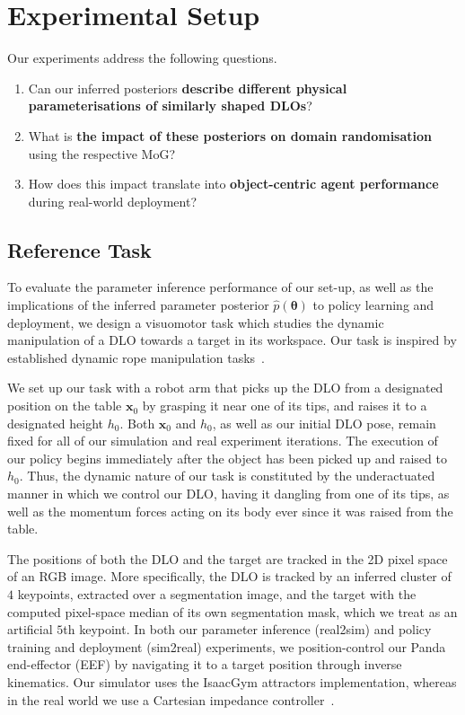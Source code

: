 \section{Experimental Setup}
\label{sec:experiments}

Our experiments address the following questions.
\begin{enumerate}
    \item Can our inferred posteriors \textbf{describe different physical parameterisations of similarly shaped DLOs}?
    \item What is \textbf{the impact of these posteriors on domain randomisation} using the respective MoG?
    \item How does this impact translate into \textbf{object-centric agent performance} during real-world deployment?
\end{enumerate}

\subsection{Reference Task}
\label{subsec:reference-task}

To evaluate the parameter inference performance of our set-up, as well as the implications of the inferred parameter posterior $\hat{p}(\boldsymbol{\theta})$ to policy learning and deployment, we design a visuomotor task which studies the dynamic manipulation of a DLO towards a target in its workspace. Our task is inspired by established dynamic rope manipulation tasks~\cite{lim2022real2sim2real, chi2024iterative}. 

We set up our task with a robot arm that picks up the DLO from a designated position on the table $\mathbf{x}_0$ by grasping it near one of its tips, and raises it to a designated height $h_0$. Both $\mathbf{x}_0$ and $h_0$, as well as our initial DLO pose, remain fixed for all of our simulation and real experiment iterations. The execution of our policy begins immediately after the object has been picked up and raised to $h_0$. Thus, the dynamic nature of our task is constituted by the underactuated manner in which we control our DLO, having it dangling from one of its tips, as well as the momentum forces acting on its body ever since it was raised from the table.

The positions of both the DLO and the target are tracked in the 2D pixel space of an RGB image. More specifically, the DLO is tracked by an inferred cluster of $4$ keypoints, extracted over a segmentation image, and the target with the computed pixel-space median of its own segmentation mask, which we treat as an artificial $5$th keypoint.
In both our parameter inference (real2sim) and policy training and deployment (sim2real) experiments, we position-control our Panda end-effector (EEF) by navigating it to a target position through inverse kinematics. Our simulator uses the IsaacGym attractors implementation, whereas in the real world we use a Cartesian impedance controller~\cite{luo2024serl}.

